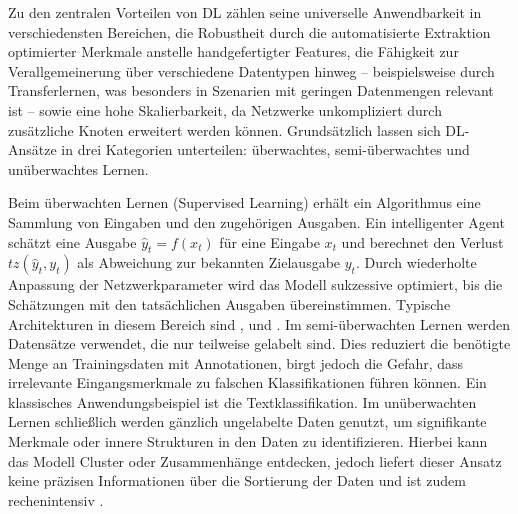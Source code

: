 Zu den zentralen Vorteilen von \acrshort{DL} zählen seine universelle Anwendbarkeit in verschiedensten Bereichen, die Robustheit durch die automatisierte Extraktion optimierter Merkmale anstelle handgefertigter Features, die Fähigkeit zur Verallgemeinerung über verschiedene Datentypen hinweg – beispielsweise durch Transferlernen, was besonders in Szenarien mit geringen Datenmengen relevant ist – sowie eine hohe Skalierbarkeit, da Netzwerke unkompliziert durch zusätzliche Knoten erweitert werden können. Grundsätzlich lassen sich DL-Ansätze in drei Kategorien unterteilen: überwachtes, semi-überwachtes und unüberwachtes Lernen\cite{Alzubaidi2021}.  

Beim überwachten Lernen (Supervised Learning) erhält ein Algorithmus eine Sammlung von Eingaben und den zugehörigen Ausgaben. Ein intelligenter Agent schätzt eine Ausgabe $\hat{y}_t = f(x_t)$ für eine Eingabe $x_t$ und berechnet den Verlust $tz(\hat{y}_t, y_t)$ als Abweichung zur bekannten Zielausgabe $y_t$. Durch wiederholte Anpassung der Netzwerkparameter wird das Modell sukzessive optimiert, bis die Schätzungen mit den tatsächlichen Ausgaben übereinstimmen. Typische Architekturen in diesem Bereich sind ,  und . Im semi-überwachten Lernen werden Datensätze verwendet, die nur teilweise gelabelt sind. Dies reduziert die benötigte Menge an Trainingsdaten mit Annotationen, birgt jedoch die Gefahr, dass irrelevante Eingangsmerkmale zu falschen Klassifikationen führen können. Ein klassisches Anwendungsbeispiel ist die Textklassifikation. Im unüberwachten Lernen schließlich werden gänzlich ungelabelte Daten genutzt, um signifikante Merkmale oder innere Strukturen in den Daten zu identifizieren. Hierbei kann das Modell Cluster oder Zusammenhänge entdecken, jedoch liefert dieser Ansatz keine präzisen Informationen über die Sortierung der Daten und ist zudem rechenintensiv \cite{Alzubaidi2021}.  

